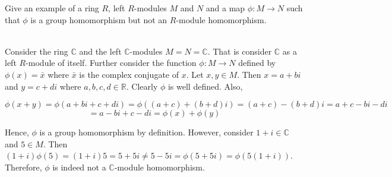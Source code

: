 Give an example of a ring $R$, left $R$-modules $M$ and $N$ and a map $\phi:M\rightarrow N$ such that
$\phi$ is a group homomorphism but not an $R$-module homomorphism.

\begin{solution}\renewcommand{\qedsymbol}{}\ \\
    Consider the ring $\mathbb{C}$ and the left $\mathbb{C}$-modules $M=N=\mathbb{C}$. That is consider
    $\mathbb{C}$ as a left $R$-module of itself. Further consider the function $\phi:M\rightarrow N$
    defined by $\phi(x)=\bar{x}$ where $\bar{x}$ is the complex conjugate of $x$. Let $x,y\in M$. Then
    $x=a+bi$ and $y=c+di$ where $a,b,c,d\in\mathbb{R}$. Clearly $\phi$ is well defined. Also,
    
    $$\phi(x+y)=\phi(a+bi+c+di)=\phi((a+c)+(b+d)i)=(a+c)-(b+d)i=a+c-bi-di$$
    $$=a-bi+c-di=\phi(x)+\phi(y)$$
    
    Hence, $\phi$ is a group homomorphism by definition. However, consider $1+i\in\mathbb{C}$ and
    $5\in M$. Then $(1+i)\phi(5)=(1+i)5=5+5i\neq5-5i=\phi(5+5i)=\phi(5(1+i))$. Therefore, $\phi$ is
    indeed not a $\mathbb{C}$-module homomorphism.

\end{solution}